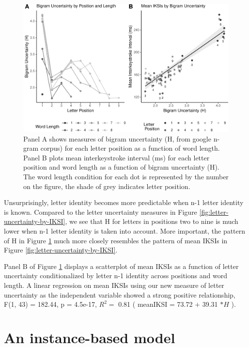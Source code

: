 \documentclass[floatsintext,man]{apa6}
\theoremstyle{definition}
\theoremstyle{definition}
\theoremstyle{definition}
\theoremstyle{remark}
\begin{document}
\begin{figure}[htbp]
\centering
\includegraphics{Entropy_typing_draft_files/figure-latex/letter-uncertainty-bigram-1.pdf}
\caption{\label{fig:letter-uncertainty-bigram}Panel A shows measures of bigram
uncertainty (H, from google n-gram corpus) for each letter position as a
function of word length. Panel B plots mean interkeystroke interval (ms)
for each letter position and word length as a function of bigram
uncertainty (H). The word length condition for each dot is represented
by the number on the figure, the shade of grey indicates letter
position.}
\end{figure}

Unsurprisingly, letter identity becomes more predictable when n-1 letter
identity is known. Compared to the letter uncertainty measures in Figure
\ref{fig:letter-uncertainty-by-IKSI}, we see that H for letters in
positions two to nine is much lower when n-1 letter identity is taken
into account. More important, the pattern of H in Figure
\ref{fig:letter-uncertainty-bigram} much more closely resembles the
pattern of mean IKSIs in Figure \ref{fig:letter-uncertainty-by-IKSI}.

Panel B of Figure \ref{fig:letter-uncertainty-bigram} displays a
scatterplot of mean IKSIs as a function of letter uncertainty
conditionalized by letter n-1 identity across positions and word length.
A linear regression on mean IKSIs using our new measure of letter
uncertainty as the independent variable showed a strong positive
relationship, F(1, 43) = 182.44, p = 4.5e-17, \(R^2 =\) 0.81 ( meanIKSI
= 73.72 \(+\) 39.31 \(* H\) ).

\section{An instance-based model}\label{an-instance-based-model}
\end{document}
